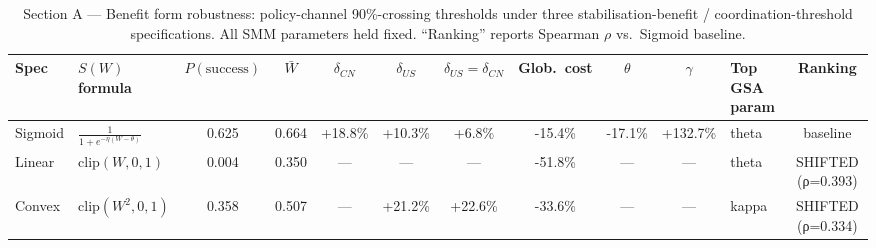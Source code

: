 \begin{table}[ht]
\centering
\caption{Section A — Benefit form robustness: policy-channel 90\%-crossing thresholds under three stabilisation-benefit / coordination-threshold specifications. All SMM parameters held fixed. ``Ranking'' reports Spearman $\rho$ vs.\ Sigmoid baseline.}
\label{tab:robustness_functional_form}
\begin{tabular}{llcccccccclc}
\toprule
Spec & $S(W)$ formula & $P(\text{success})$ & $\bar{W}$ & $\delta_{CN}$ & $\delta_{US}$ & $\delta_{US}{=}\delta_{CN}$ & Glob.\ cost & $\theta$ & $\gamma$ & Top GSA param & Ranking \\
\midrule
  Sigmoid & $\frac{1}{1+e^{-\eta(W-\theta)}}$ & 0.625 & 0.664 & +18.8\% & +10.3\% & +6.8\% & -15.4\% & -17.1\% & +132.7\% & theta & baseline \\
  Linear & $\mathrm{clip}(W,0,1)$ & 0.004 & 0.350 & — & — & — & -51.8\% & — & — & theta & SHIFTED (ρ=0.393) \\
  Convex & $\mathrm{clip}(W^2,0,1)$ & 0.358 & 0.507 & — & +21.2\% & +22.6\% & -33.6\% & — & — & kappa & SHIFTED (ρ=0.334) \\
\bottomrule
\end{tabular}
\end{table}